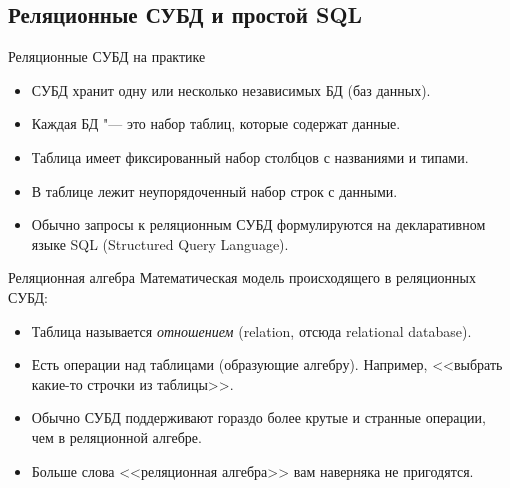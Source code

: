 \subsection{Реляционные СУБД и простой SQL}

\begin{frame}{Реляционные СУБД на практике}
	\begin{itemize}
		\item СУБД хранит одну или несколько независимых БД (баз данных).
		\item Каждая БД "--- это набор таблиц, которые содержат данные.
		\item Таблица имеет фиксированный набор столбцов с названиями и типами.
		\item В таблице лежит неупорядоченный набор строк с данными.
		\item Обычно запросы к реляционным СУБД формулируются на декларативном языке SQL
			(Structured Query Language).
	\end{itemize}
\end{frame}

\begin{frame}{Реляционная алгебра}
	Математическая модель происходящего в реляционных СУБД:
	\begin{itemize}
		\item Таблица называется \textit{отношением} (relation, отсюда relational database).
		\item Есть операции над таблицами (образующие алгебру).
			Например, <<выбрать какие-то строчки из таблицы>>.
		\item Обычно СУБД поддерживают гораздо более крутые и странные операции,
			чем в реляционной алгебре.
		\item Больше слова <<реляционная алгебра>> вам наверняка не пригодятся.
	\end{itemize}
\end{frame}
